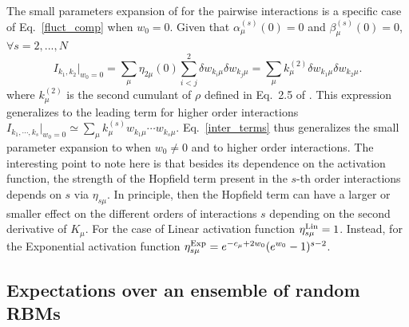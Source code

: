 \documentclass[11pt,letterpaper]{article}
\renewcommand{\red}[1]{#1}
\begin{document}
The small parameters expansion of \cite{10.1162/neco_a_01420} for the pairwise interactions is a specific case of Eq.~\eqref{fluct_comp} when $w_{0}=0$. Given that $\alpha_{\mu}^{(s)}(0)=0$ and $\beta_{\mu}^{(s)}(0)=0$, $\forall s=2,...,N$
\begin{equation*}
    I_{k_{1},k_{2}}\biggl|_{w_{0}=0} =\sum_{\mu}\eta_{2\mu}(0)\sum_{i<j}^{2}  \delta w_{k_{i}\mu}\delta w_{k_{j}\mu}=\sum_{\mu}k^{(2)}_{\mu}\delta w_{k_{1}\mu}\delta w_{k_{2}\mu}.
    \label{pair_small}
\end{equation*}
where $k_{\mu}^{(2)}$ is the second cumulant of $\rho$ defined in Eq.~2.5 of \cite{10.1162/neco_a_01420}. {\red This expression generalizes to the leading term for higher order interactions $I_{k_{1},\cdots,k_{s}}\biggl|_{w_{0}=0}\simeq \sum_{\mu}k_{\mu}^{(s)}w_{k_1\mu}\cdots w_{k_{s}\mu}$}. Eq.~\eqref{inter_terms} thus generalizes the small parameter expansion to when $w_0\neq0$ and to higher order interactions. The interesting point to note here is that besides its dependence on the activation function, the strength of the Hopfield term present in the $s$-th order interactions depends on $s$ via $\eta_{s\mu}$. In principle, then the Hopfield term can have a larger or smaller effect on the different orders of interactions $s$ depending on the second derivative of $K_{\mu}$. For the case of Linear activation function $\eta^{\rm Lin}_{s\mu}=1$. Instead, for the Exponential activation function $\eta^{\rm Exp}_{s\mu}=e^{-c_\mu+2w_0} (e^{w_0}-1)^{s-2}$.

\subsection{Expectations over an ensemble of random RBMs}
\end{document}
